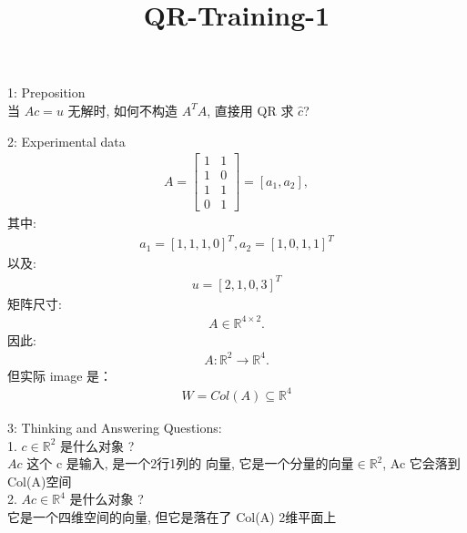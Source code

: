 \documentclass[12pt]{article}
\title{QR-Training-1}
\date{}
\begin{document}
\maketitle
\begin{flushleft}
    1: Preposition \\
    当 $Ac = u$ 无解时, 如何不构造 $A^{T}A$, 直接用 QR 求 $\hat{c}$?

    2: Experimental data \\

    \begin{align}
        A = \begin{bmatrix}
                1 & 1 \\
                1 & 0 \\
                1 & 1 \\
                0 & 1
            \end{bmatrix} = [a_{1}, a_{2}],
    \end{align}
    其中: \\
    \begin{align}
        a_{1} = [1,1,1,0]^{T}, a_{2} = [1, 0, 1, 1]^{T}
    \end{align}
    以及: \\
    \begin{align}
        u = [2, 1, 0, 3]^{T}
    \end{align}
    矩阵尺寸: \\
    \begin{align}
        A \in  \mathbb{R}^{4 \times 2}.
    \end{align}
    因此:\\
    \begin{align}
        A: \mathbb{R}^{2} \to  \mathbb{R}^{4}.
    \end{align}
    但实际 image 是：\\
    \begin{align}
        W  = Col(A) \subseteq \mathbb{R}^{4}
    \end{align}

    3: Thinking and Answering Questions: \\
    1. $ c \in  \mathbb{R}^{2}$ 是什么对象 ? \\
    $Ac$ 这个 c 是输入, 是一个2行1列的 向量, 它是一个分量的向量$\in \mathbb{R}^{2}$, Ac 它会落到 Col(A)空间\\

    2. $Ac \in \mathbb{R}^{4}$ 是什么对象 ? \\
    它是一个四维空间的向量, 但它是落在了 Col(A) 2维平面上 \\


\end{flushleft}
\end{document}
